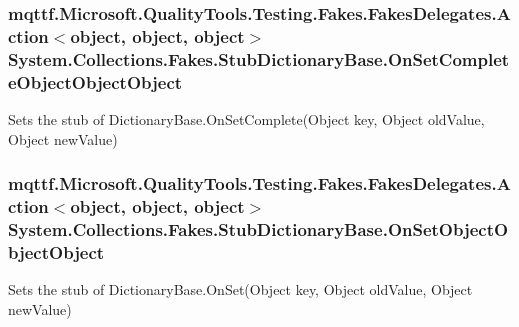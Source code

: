 \hypertarget{class_system_1_1_collections_1_1_fakes_1_1_stub_dictionary_base_a29c91a752f36933b9e96eb6563c636dc}{
\subsubsection[{On\-Set\-Complete\-Object\-Object\-Object}]{\setlength{\rightskip}{0pt plus 5cm}mqttf.\-Microsoft.\-Quality\-Tools.\-Testing.\-Fakes.\-Fakes\-Delegates.\-Action$<$object, object, object$>$ System.\-Collections.\-Fakes.\-Stub\-Dictionary\-Base.\-On\-Set\-Complete\-Object\-Object\-Object}}\label{class_system_1_1_collections_1_1_fakes_1_1_stub_dictionary_base_a29c91a752f36933b9e96eb6563c636dc}


Sets the stub of Dictionary\-Base.\-On\-Set\-Complete(\-Object key, Object old\-Value, Object new\-Value)

\hypertarget{class_system_1_1_collections_1_1_fakes_1_1_stub_dictionary_base_a649c2f103bf4e362fe12dd954a91245f}{
\subsubsection[{On\-Set\-Object\-Object\-Object}]{\setlength{\rightskip}{0pt plus 5cm}mqttf.\-Microsoft.\-Quality\-Tools.\-Testing.\-Fakes.\-Fakes\-Delegates.\-Action$<$object, object, object$>$ System.\-Collections.\-Fakes.\-Stub\-Dictionary\-Base.\-On\-Set\-Object\-Object\-Object}}\label{class_system_1_1_collections_1_1_fakes_1_1_stub_dictionary_base_a649c2f103bf4e362fe12dd954a91245f}


Sets the stub of Dictionary\-Base.\-On\-Set(\-Object key, Object old\-Value, Object new\-Value)

